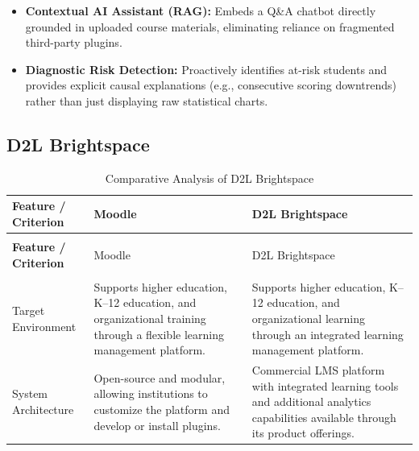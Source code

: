 \begin{itemize}
    \item \textbf{Contextual AI Assistant (RAG):} Embeds a Q\&A chatbot directly grounded in uploaded course materials, eliminating reliance on fragmented third-party plugins.
    \item \textbf{Diagnostic Risk Detection:} Proactively identifies at-risk students and provides explicit causal explanations (e.g., consecutive scoring downtrends) rather than just displaying raw statistical charts.
\end{itemize}


\subsection{D2L Brightspace}

\begin{xltabular}{\textwidth}{>{\bfseries}p{2.8cm} X X}

    \caption{Comparative Analysis of D2L Brightspace}
    \label{tab:brightspace_comparison} \\

    \toprule
    Feature / Criterion & Moodle & D2L Brightspace \\
    \midrule
    \endfirsthead

     \\
    \toprule
    Feature / Criterion & Moodle & D2L Brightspace \\
    \midrule
    \endhead

    \midrule
     \\
    \endfoot

    \bottomrule
    \endlastfoot


    Target Environment &
    Supports higher education, K--12 education, and organizational
    training through a flexible learning management platform. &
    Supports higher education, K--12 education, and organizational
    learning through an integrated learning management platform. \\

    \addlinespace

    System Architecture &
    Open-source and modular, allowing institutions to customize the
    platform and develop or install plugins. &
    Commercial LMS platform with integrated learning tools and
    additional analytics capabilities available through its product
    offerings. \\


\end{xltabular}
